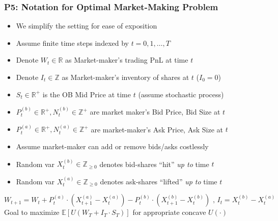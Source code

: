 \documentclass[handout]{beamer}
\begin{document}
\begin{frame}
\frametitle{P5: Notation for Optimal Market-Making Problem}
\pause
\begin{itemize}[<+->]
\item We simplify the setting for ease of exposition
\item Assume finite time steps indexed by $t= 0, 1, \ldots, T$
\item Denote $W_t \in \mathbb{R}$ as Market-maker's trading PnL at time $t$
\item Denote $I_t \in \mathbb{Z}$ as Market-maker's inventory of shares at $t$ ($I_0 = 0$)
\item $S_t \in \mathbb{R}^+$ is the OB Mid Price at time $t$ (assume stochastic process)
\item $P_t^{(b)} \in \mathbb{R}^+, N_t^{(b)} \in \mathbb{Z}^+$ are market maker's Bid Price, Bid Size at $t$
\item $P_t^{(a)} \in \mathbb{R}^+, N_t^{(a)} \in \mathbb{Z}^+$ are market-maker's Ask Price, Ask Size at $t$
\item Assume market-maker can add or remove bids/asks costlessly
\item Random var $X_t^{(b)} \in \mathbb{Z}_{\geq 0}$ denotes bid-shares ``hit'' {\em up to} time $t$
\item Random var $X_t^{(a)} \in \mathbb{Z}_{\geq 0}$ denotes ask-shares ``lifted'' {\em up to} time $t$
\end{itemize}
\pause
$$W_{t+1} = W_t + P_t^{(a)} \cdot (X_{t+1}^{(a)} - X_t^{(a)}) - P_t^{(b)} \cdot (X_{t+1}^{(b)} - X_t^{(b)}) \mbox{ , } I_t = X_t^{(b)} - X_t^{(a)}$$
\pause
Goal to maximize $\mathbb{E}[U(W_T + I_T \cdot S_T)]$ for appropriate concave $U(\cdot)$
\end{frame}
\end{document}
